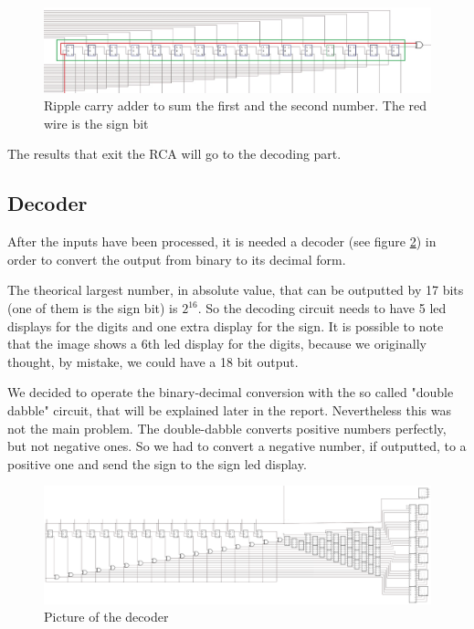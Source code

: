 \documentclass{article}
\begin{document}
\begin{figure}[h]
  \centering
  \includegraphics[scale=.4]{SC_Processing2.JPG}
  \caption{Ripple carry adder to sum the first and the second number. The red wire is the sign bit}
  \label{Processing2}
\end{figure}

The results that exit the RCA will go to the decoding part.




\subsection{Decoder}

After the inputs have been processed, it is needed a decoder (see figure \ref{Decoder}) in order to convert the output from binary to its decimal form.

\vspace{3mm}

The theorical largest number, in absolute value, that can be outputted by 17 bits (one of them is the sign bit) is $2^{16}$. So the decoding circuit needs to have 5 led displays for the digits and one extra display for the sign. It is possible to note that the image shows a 6th led display for the digits, because we originally thought, by mistake, we could have a 18 bit output.

\vspace{3mm}

We decided to operate the binary-decimal conversion with the so called "double dabble" circuit, that will be explained later in the report. Nevertheless this was not the main problem. The double-dabble converts positive numbers perfectly, but not negative ones. So we had to convert a negative number, if outputted, to a positive one and send the sign to the sign led display.

\begin{figure}[h]
    \centering
    \includegraphics[scale=0.42]{SC_Decoder}
    \caption{Picture of the decoder}
    \label{Decoder}
  \end{figure}
\end{document}
